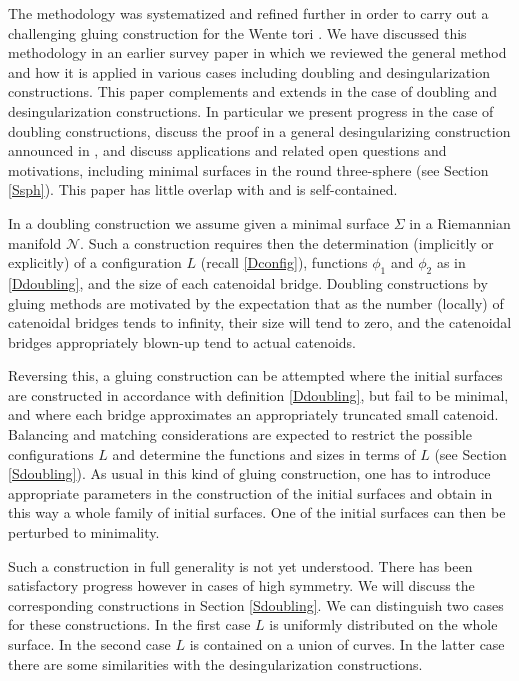 \documentclass[12pt,namelimits,sumlimits]{amsart}
\theoremstyle{remark}
\numberwithin{equation}{section}
\begin{document}
The methodology was systematized and refined further in order to carry out
a challenging gluing construction for the Wente tori
\cite{kapouleas:wente:announce,kapouleas:wente}.
We have discussed this methodology in an earlier survey paper \cite{kapouleas:survey}
in which we reviewed the general method and how it is applied in various cases including
doubling and desingularization constructions.
This paper complements and extends \cite{kapouleas:survey}
in the case of doubling and desingularization constructions.
In particular we present progress in the case of doubling constructions,
discuss the proof in a general desingularizing construction announced in
\cite[Theorem F]{kapouleas:survey},
and discuss applications and related open questions and motivations,
including minimal surfaces in the round three-sphere (see Section \ref{Ssph}).
This paper has little overlap with \cite{kapouleas:survey} and is self-contained.

In a doubling construction we assume given
a minimal surface $\Sigma$ in a Riemannian manifold ${{\mathcal{N}}}$. 
Such a construction requires then the determination (implicitly or explicitly)
of a configuration $L$ (recall \ref{Dconfig}),
functions $\phi_1$ and $\phi_2$ as in \ref{Ddoubling},
and the size of each catenoidal bridge.
Doubling constructions by gluing methods are motivated by the expectation that as the number (locally)
of catenoidal bridges tends to infinity, their size will tend to zero, and the catenoidal bridges appropriately
blown-up tend to actual catenoids.

Reversing this, a gluing construction can be attempted where the initial surfaces are constructed 
in accordance with definition \ref{Ddoubling}, but fail to be minimal, and where each bridge
approximates an appropriately truncated small catenoid.
Balancing and matching considerations are expected to restrict the possible configurations $L$
and determine the functions and sizes in terms of $L$ (see Section \ref{Sdoubling}).
As usual in this kind of gluing construction,
one has to introduce appropriate parameters in the construction of the initial surfaces
and obtain in this way a whole family of initial surfaces.
One of the initial surfaces can then be perturbed to minimality.

Such a construction in full generality is not yet understood.
There has been satisfactory progress however in cases of high symmetry.
We will discuss the corresponding constructions in Section \ref{Sdoubling}.
We can distinguish two cases for these constructions.
In the first case $L$ is uniformly distributed on the whole surface.
In the second case $L$ is contained on a union of curves.
In the latter case there are some similarities with the desingularization constructions.
\end{document}
